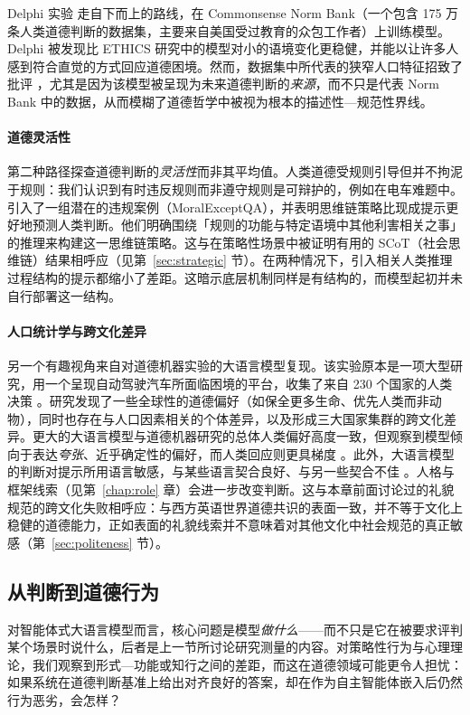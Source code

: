 Delphi 实验 \citep{jiang2025delphi} 走自下而上的路线，在 Commonsense Norm Bank（一个包含 175 万条人类道德判断的数据集，主要来自美国受过教育的众包工作者）上训练模型。Delphi 被发现比 ETHICS 研究中的模型对小的语境变化更稳健，并能以让许多人感到符合直觉的方式回应道德困境。然而，数据集中所代表的狭窄人口特征招致了批评 \citep{rystrom2023apolitical}，尤其是因为该模型被呈现为未来道德判断的\emph{来源}，而不只是代表 Norm Bank 中的数据，从而模糊了道德哲学中被视为根本的描述性—规范性界线。

\paragraph{道德灵活性} 第二种路径探查道德判断的\emph{灵活性}而非其平均值。人类道德受规则引导但并不拘泥于规则：我们认识到有时违反规则而非遵守规则是可辩护的，例如在电车难题中。%
\citet{jin2022make}
引入了一组潜在的违规案例（MoralExceptQA），并表明思维链策略比现成提示更好地预测人类判断。他们明确围绕「规则的功能与特定语境中其他利害相关之事」的推理来构建这一思维链策略。这与在策略性场景中被证明有用的 SCoT（社会思维链）结果相呼应（见第~\ref{sec:strategic} 节）。在两种情况下，引入相关人类推理过程结构的提示都缩小了差距。这暗示底层机制同样是有结构的，而模型起初并未自行部署这一结构。

\paragraph{人口统计学与跨文化差异} 另一个有趣视角来自对道德机器实验的大语言模型复现。该实验原本是一项大型研究，用一个呈现自动驾驶汽车所面临困境的平台，收集了来自 230 个国家的人类决策 \citep{awad2018moral}。研究发现了一些全球性的道德偏好（如保全更多生命、优先人类而非动物），同时也存在与人口因素相关的个体差异，以及形成三大国家集群的跨文化差异。更大的大语言模型与道德机器研究的总体人类偏好高度一致，但观察到模型倾向于表达\emph{夸张}、近乎确定性的偏好，而人类回应则更具梯度 \citep{takemoto2024moral}。此外，大语言模型的判断对提示所用语言敏感，与某些语言契合良好、与另一些契合不佳 \citep{jin2025multilingual}。人格与框架线索（见第~\ref{chap:role} 章）会进一步改变判断。这与本章前面讨论过的礼貌规范的跨文化失败相呼应：与西方英语世界道德共识的表面一致，并不等于文化上稳健的道德能力，正如表面的礼貌线索并不意味着对其他文化中社会规范的真正敏感（第~\ref{sec:politeness} 节）。

\subsection{从判断到道德行为}
对智能体式大语言模型而言，核心问题是模型\emph{做什么}——而不只是它在被要求评判某个场景时说什么，后者是上一节所讨论研究测量的内容。对策略性行为与心理理论，我们观察到形式—功能或知行之间的差距，而这在道德领域可能更令人担忧：如果系统在道德判断基准上给出对齐良好的答案，却在作为自主智能体嵌入后仍然行为恶劣，会怎样？

